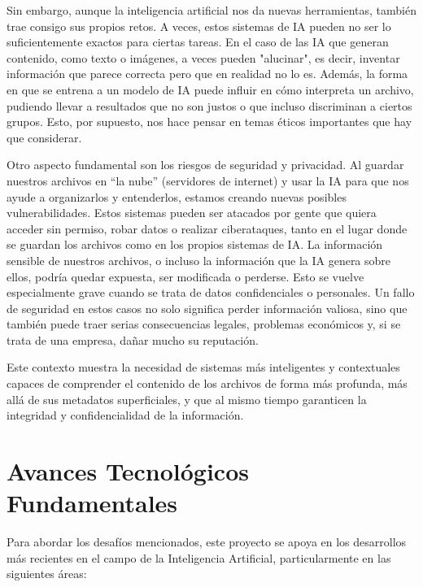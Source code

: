 Sin embargo, aunque la inteligencia artificial nos da nuevas herramientas, también trae consigo sus propios retos. A veces, estos sistemas de IA pueden no ser lo suficientemente exactos para ciertas tareas. En el caso de las IA que generan contenido, como texto o imágenes, a veces pueden "alucinar", es decir, inventar información que parece correcta pero que en realidad no lo es. Además, la forma en que se entrena a un modelo de IA puede influir en cómo interpreta un archivo, pudiendo llevar a resultados que no son justos o que incluso discriminan a ciertos grupos. Esto, por supuesto, nos hace pensar en temas éticos importantes que hay que considerar.

Otro aspecto fundamental son los riesgos de seguridad y privacidad. Al guardar nuestros archivos en ``la nube'' (servidores de internet) y usar la IA para que nos ayude a organizarlos y entenderlos, estamos creando nuevas posibles vulnerabilidades. Estos sistemas pueden ser atacados por gente que quiera acceder sin permiso, robar datos o realizar ciberataques, tanto en el lugar donde se guardan los archivos como en los propios sistemas de IA. La información sensible de nuestros archivos, o incluso la información que la IA genera sobre ellos, podría quedar expuesta, ser modificada o perderse. Esto se vuelve especialmente grave cuando se trata de datos confidenciales o personales. Un fallo de seguridad en estos casos no solo significa perder información valiosa, sino que también puede traer serias consecuencias legales, problemas económicos y, si se trata de una empresa, dañar mucho su reputación.

Este contexto muestra la necesidad de sistemas más inteligentes y contextuales capaces de comprender el contenido de los archivos de forma más profunda, más allá de sus metadatos superficiales, y que al mismo tiempo garanticen la integridad y confidencialidad de la información.

\section{Avances Tecnológicos Fundamentales}
Para abordar los desafíos mencionados, este proyecto se apoya en los desarrollos más recientes en el campo de la Inteligencia Artificial, particularmente en las siguientes áreas:


